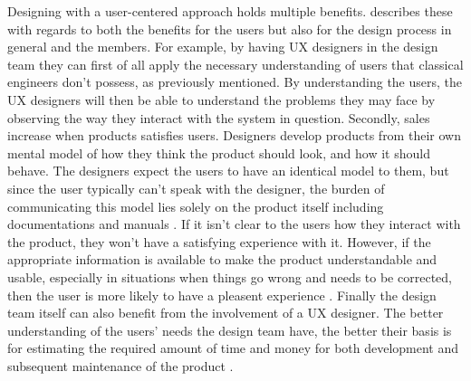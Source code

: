 \noindent
Designing with a user-centered approach holds multiple benefits. \textcite{WEB:UXBenefits} describes these with regards to both the benefits for the users but also for the design process in general and the members. For example, by having UX designers in the design team they can first of all apply the necessary understanding of users that classical engineers don't possess, as previously mentioned. By understanding the users, the UX designers will then be able to understand the problems they may face by observing the way they interact with the system in question. Secondly, sales increase when products satisfies users. Designers develop products from their own mental model of how they think the product should look, and how it should behave. The designers expect the users to have an identical model to them, but since the user typically can't speak with the designer, the burden of communicating this model lies solely on the product itself including documentations and manuals \parencite[][31]{PDF:DonNorman}. If it isn't clear to the users how they interact with the product, they won't have a satisfying experience with it. However, if the appropriate information is available to make the product understandable and usable, especially in situations when things go wrong and needs to be corrected, then the user is more likely to have a pleasent experience \parencite[][32]{PDF:DonNorman}. Finally the design team itself can also benefit from the involvement of a UX designer. The better understanding of the users' needs the design team have, the better their basis is for estimating the required amount of time and money for both development and subsequent maintenance of the product \parencite{WEB:UXBenefits}.\\

